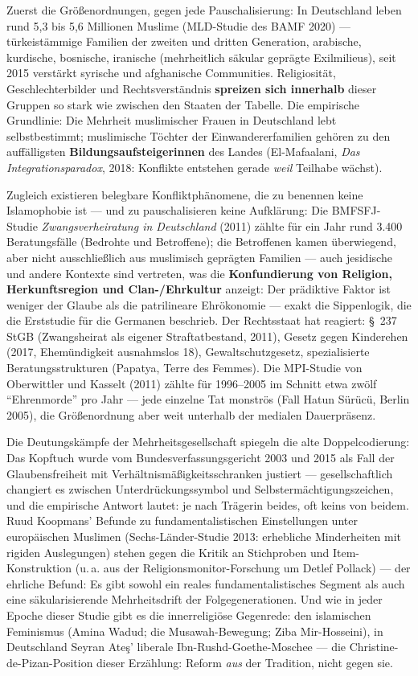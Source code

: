 \documentclass[11pt,a4paper,ngerman]{scrartcl}
\newcommand{\chipbase}[2]{\hspace{0pt}{\footnotesize\textcolor{#1}{[\textsc{#2}]}}}
\newcommand{\chipbelegt}[1]{\chipbase{chipgreen}{#1}}
\newcommand{\chipplausibel}[1]{\chipbase{chipamber}{#1}}
\newcommand{\chipumstritten}[1]{\chipbase{chipred}{#1}}
\begin{document}
Zuerst die Größenordnungen, gegen jede Pauschalisierung: In Deutschland leben rund 5,3 bis 5,6 Millionen Muslime (MLD-Studie des BAMF 2020) --- türkeistämmige Familien der zweiten und dritten Generation, arabische, kurdische, bosnische, iranische (mehrheitlich säkular geprägte Exilmilieus), seit 2015 verstärkt syrische und afghanische Communities. Religiosität, Geschlechterbilder und Rechtsverständnis \textbf{spreizen sich innerhalb} dieser Gruppen so stark wie zwischen den Staaten der Tabelle. Die empirische Grundlinie: Die Mehrheit muslimischer Frauen in Deutschland lebt selbstbestimmt; muslimische Töchter der Einwandererfamilien gehören zu den auffälligsten \textbf{Bildungsaufsteigerinnen} des Landes (El-Mafaalani, \emph{Das Integrationsparadox}, 2018: Konflikte entstehen gerade \emph{weil} Teilhabe wächst). \chipbelegt{belegt}

Zugleich existieren belegbare Konfliktphänomene, die zu benennen keine Islamophobie ist --- und zu pauschalisieren keine Aufklärung: Die BMFSFJ-Studie \emph{Zwangsverheiratung in Deutschland} (2011) zählte für ein Jahr rund 3.400 Beratungsfälle (Bedrohte und Betroffene); die Betroffenen kamen überwiegend, aber nicht ausschließlich aus muslimisch geprägten Familien --- auch jesidische und andere Kontexte sind vertreten, was die \textbf{Konfundierung von Religion, Herkunftsregion und Clan-/Ehrkultur} anzeigt: Der prädiktive Faktor ist weniger der Glaube als die patrilineare Ehrökonomie --- exakt die Sippenlogik, die die Erststudie für die Germanen beschrieb. \chipplausibel{plausibel} Der Rechtsstaat hat reagiert: \S~237 StGB (Zwangsheirat als eigener Straftatbestand, 2011), Gesetz gegen Kinderehen (2017, Ehemündigkeit ausnahmslos 18), Gewaltschutzgesetz, spezialisierte Beratungsstrukturen (Papatya, Terre des Femmes). Die MPI-Studie von Oberwittler und Kasselt (2011) zählte für 1996--2005 im Schnitt etwa zwölf \enquote{Ehrenmorde} pro Jahr --- jede einzelne Tat monströs (Fall Hatun Sürücü, Berlin 2005), die Größenordnung aber weit unterhalb der medialen Dauerpräsenz. \chipbelegt{belegt}

Die Deutungskämpfe der Mehrheitsgesellschaft spiegeln die alte Doppelcodierung: Das Kopftuch wurde vom Bundesverfassungsgericht 2003 und 2015 als Fall der Glaubensfreiheit mit Verhältnismäßigkeitsschranken justiert --- gesellschaftlich changiert es zwischen Unterdrückungssymbol und Selbstermächtigungszeichen, und die empirische Antwort lautet: je nach Trägerin beides, oft keins von beidem. Ruud Koopmans' Befunde zu fundamentalistischen Einstellungen unter europäischen Muslimen (Sechs-Länder-Studie 2013: erhebliche Minderheiten mit rigiden Auslegungen) stehen gegen die Kritik an Stichproben und Item-Konstruktion (u.\,a. aus der Religionsmonitor-Forschung um Detlef Pollack) --- der ehrliche Befund: Es gibt sowohl ein reales fundamentalistisches Segment als auch eine säkularisierende Mehrheitsdrift der Folgegenerationen. \chipumstritten{umstritten} Und wie in jeder Epoche dieser Studie gibt es die innerreligiöse Gegenrede: den islamischen Feminismus (Amina Wadud; die Musawah-Bewegung; Ziba Mir-Hosseini), in Deutschland Seyran Ateş' liberale Ibn-Rushd-Goethe-Moschee --- die Christine-de-Pizan-Position dieser Erzählung: Reform \emph{aus} der Tradition, nicht gegen sie. \chipbelegt{belegt}
\end{document}

